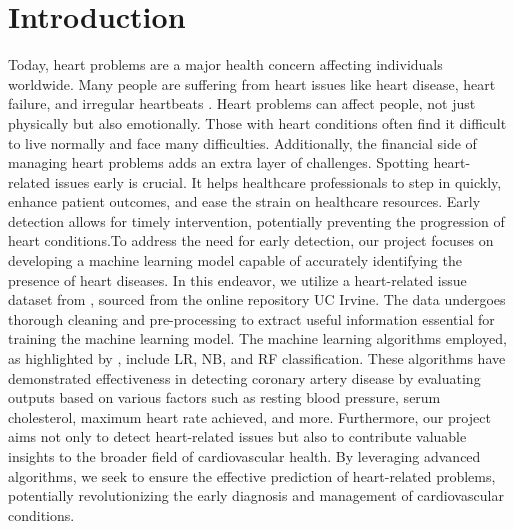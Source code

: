 \chapter{Introduction}
\label{ch:into} %
Today, heart problems are a major health concern affecting individuals worldwide. Many people 
are suffering from heart issues like heart disease, heart failure, and irregular heartbeats \cite{webb2015care}. Heart problems can affect people, not just physically but also emotionally. Those 
with heart conditions often find it difficult to live normally and face many difficulties.
Additionally, the financial side of managing heart problems adds an extra layer of challenges. 
Spotting heart-related issues early is crucial. It helps healthcare professionals to step in 
quickly, enhance patient outcomes, and ease the strain on healthcare resources. Early detection  
allows for timely intervention, potentially preventing the progression of heart conditions.To 
address the need for early detection, our project focuses on developing a machine learning 
model capable of accurately identifying the presence of heart diseases. In this endeavor, we 
utilize a heart-related issue dataset from \citep{janosi-1988}, sourced from the online 
repository UC Irvine. The data undergoes thorough cleaning and pre-processing to extract useful 
information essential for training the machine learning model. The machine learning algorithms 
employed, as highlighted by \citep{Sharma-2020}, include LR, NB, and 
RF classification. These algorithms have demonstrated effectiveness in detecting 
coronary artery disease by evaluating outputs based on various factors such as resting blood 
pressure, serum cholesterol, maximum heart rate achieved, and more. Furthermore, our project 
aims not only to detect heart-related issues but also to contribute valuable insights to the 
broader field of cardiovascular health. By leveraging advanced algorithms, we seek to ensure 
the effective prediction of heart-related problems, potentially revolutionizing the early 
diagnosis and management of cardiovascular conditions.
